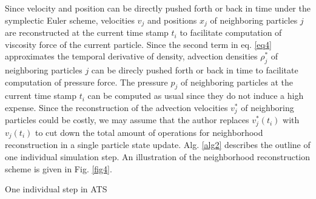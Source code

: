 \documentclass[
	11pt, 
	DIV10,
	ngerman,
	a4paper, 
	oneside, 
	headings=normal, 
	captions=tableheading,
	final, 
	numbers=noenddot
]{scrartcl}
\begin{document}
Since velocity and position can be directly pushed forth or back in time under the symplectic Euler scheme, velocities $ v_{j} $ and positions $ x_{j} $ of neighboring particles $j$ are reconstructed at the current time stamp $ t_{i} $ to facilitate computation of viscosity force of the current particle. Since the second term in eq. \ref{eq4} approximates the temporal derivative of density, advection densities $ \rho_{j}^{*} $ of neighboring particles $j$ can be direcly pushed forth or back in time to facilitate computation of pressure force. The pressure $ p_{j} $ of neighboring particles at the current time stamp $ t_{i} $ can be computed as usual since they do not induce a high expense. Since the reconstruction of the advection velocities $ v_{j}^{*} $ of neighboring particles could be costly, we may assume that the author replaces $ v_{j}^{*}(t_{i}) $ with $ v_{j}(t_{i}) $ to cut down the total amount of operations for neighborhood reconstruction in a single particle state update. Alg. \ref{alg2} describes the outline of one individual simulation step. An illustration of the neighborhood reconstruction scheme is given in Fig. \ref{fig4}.

\large
\begin{algorithm}
	\DontPrintSemicolon
	\SetAlgoLined
	\SetAlCapNameFnt{\large}
	\SetAlCapFnt{\large}
	\caption{\label{alg2} One individual step in ATS \cite{reinhardt2017fully}}
\end{algorithm}
\normalsize
\end{document}
